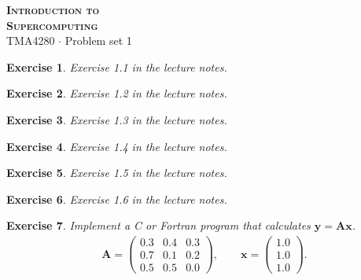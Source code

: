 \documentclass[onecolumn, oneside, a4paper, 11pt]{memoir}
\newtheorem{ex}{Exercise}
\begin{document}
\pagestyle{empty}

\begin{center}
  {\Huge \bfseries \scshape
    Introduction to \\[0.2\baselineskip] Supercomputing} \\[2\baselineskip]
  {\Large TMA4280 $\cdot$ Problem set 1} \\[2\baselineskip]
\end{center}

\begin{ex}
  Exercise 1.1 in the lecture notes.
\end{ex}

\begin{ex}
  Exercise 1.2 in the lecture notes.
\end{ex}

\begin{ex}
  Exercise 1.3 in the lecture notes.
\end{ex}

\begin{ex}
  Exercise 1.4 in the lecture notes.
\end{ex}

\begin{ex}
  Exercise 1.5 in the lecture notes.
\end{ex}

\begin{ex}
  Exercise 1.6 in the lecture notes.
\end{ex}

\begin{ex}
  Implement a C or Fortran program that calculates $\bm y = \bm A \bm x$.
  \begin{align*}
    \bm A =
    \begin{pmatrix}
      0.3 & 0.4 & 0.3 \\
      0.7 & 0.1 & 0.2 \\
      0.5 & 0.5 & 0.0
    \end{pmatrix}, \qquad \bm x = \begin{pmatrix} 1.0 \\ 1.0 \\ 1.0 \end{pmatrix}.
  \end{align*}
\end{ex}
\end{document}
